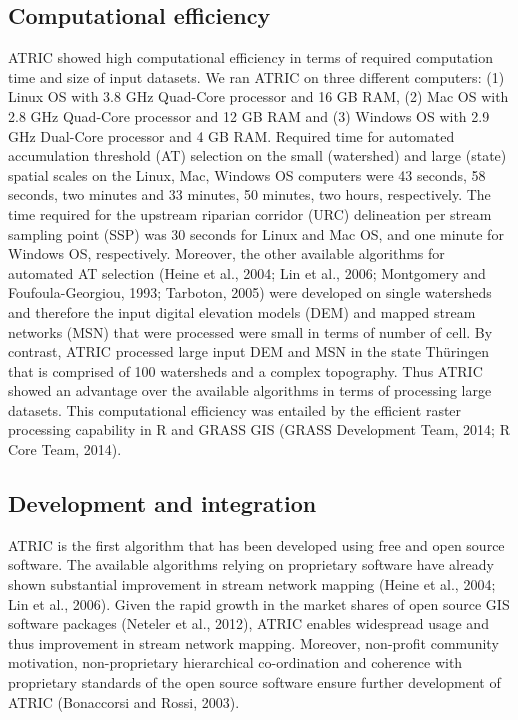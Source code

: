 \subsection{Computational efficiency}
\label{Computational efficiency}

ATRIC showed high computational efficiency in terms of required computation time and size of input datasets. We ran ATRIC on three different computers: (1) Linux OS with 3.8 GHz Quad-Core processor and 16 GB RAM, (2) Mac OS with 2.8 GHz Quad-Core processor and 12 GB RAM and (3) Windows OS with 2.9 GHz Dual-Core processor and 4 GB RAM. Required time for automated accumulation threshold (AT) selection on the small (watershed) and large (state) spatial scales on the Linux, Mac, Windows OS computers were 43 seconds, 58 seconds, two minutes and 33 minutes, 50 minutes, two hours, respectively. The time required for the upstream riparian corridor (URC) delineation per stream sampling point (SSP) was 30 seconds for Linux and Mac OS, and one minute for Windows OS, respectively. Moreover, the other available algorithms for automated AT selection (Heine et al., 2004; Lin et al., 2006; Montgomery and Foufoula-Georgiou, 1993; Tarboton, 2005) were developed on single watersheds and therefore the input digital elevation models (DEM) and mapped stream networks (MSN) that were processed were small in terms of number of cell. By contrast, ATRIC processed large input DEM and MSN in the state Thüringen that is comprised of 100 watersheds and a complex topography. Thus ATRIC showed an advantage over the available algorithms in terms of processing large datasets. This computational efficiency was entailed by the efficient raster processing capability in R and GRASS GIS (GRASS Development Team, 2014; R Core Team, 2014).

\vspace{-0.25cm}

\subsection{Development and integration}
\label{Development and integration}

ATRIC is the first algorithm that has been developed using free and open source software. The available algorithms relying on proprietary software have already shown substantial improvement in stream network mapping (Heine et al., 2004; Lin et al., 2006). Given the rapid growth in the market shares of open source GIS software packages (Neteler et al., 2012), ATRIC enables widespread usage and thus improvement in stream network mapping. Moreover, non-profit community motivation, non-proprietary hierarchical co-ordination and coherence with proprietary standards of the open source software ensure further development of ATRIC (Bonaccorsi and Rossi, 2003).

